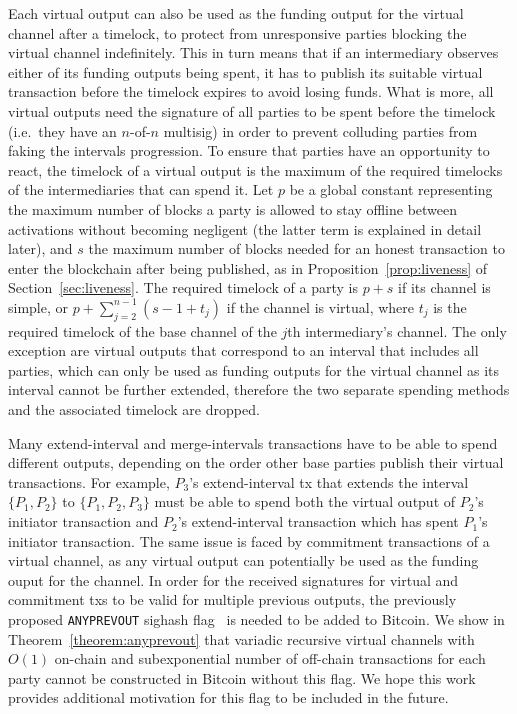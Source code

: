   Each virtual output can also be used as the funding output for the virtual
  channel after a timelock, to protect from unresponsive parties blocking the
  virtual channel indefinitely. This in turn means that if an intermediary
  observes either of its funding outputs being spent, it has to publish its
  suitable virtual transaction before the timelock expires to avoid losing
  funds. What is more, all virtual outputs need the signature of all parties to
  be spent before the timelock (i.e.\ they have an $n$-of-$n$ multisig) in order
  to prevent colluding parties from faking the intervals progression. To ensure
  that parties have an opportunity to react, the timelock of a virtual output is
  the maximum of the required timelocks of the intermediaries that can spend it.
  Let $p$ be a global constant representing the maximum number of blocks a party
  is allowed to stay offline between activations without becoming negligent
  (the latter term is explained in detail later), and
  $s$ the maximum number of blocks needed for an honest transaction to enter the
  blockchain after being published, as in Proposition~\ref{prop:liveness} of
  Section~\ref{sec:liveness}.
  The required timelock of a party is $p + s$ if its channel is simple,  or $p +
  \sum\limits_{j = 2}^{n - 1}(s - 1 + t_j)$ if the channel is virtual, where
  $t_j$ is the required timelock of the base channel
  of the $j$th intermediary's channel. The only exception are virtual outputs that
  correspond to an interval that includes all parties, which can only be used as
  funding outputs for the virtual channel as its interval cannot be further
  extended, therefore the two separate spending methods and the associated
  timelock are dropped.

  Many extend-interval and merge-intervals transactions have to be able to spend
  different outputs, depending on the order other base parties publish their
  virtual transactions. For example, $P_3$'s extend-interval tx that extends the
  interval $\{P_1, P_2\}$ to $\{P_1, P_2, P_3\}$ must be able to spend both
  the virtual output of $P_2$'s initiator transaction and $P_2$'s
  extend-interval transaction which has spent $P_1$'s initiator transaction. The
  same issue is faced by commitment transactions of a virtual channel, as any
  virtual output can potentially be used as the funding ouput for the channel.
  In order for the received signatures for virtual and commitment txs to be
  valid for multiple previous outputs, the previously proposed
  \texttt{ANYPREVOUT} sighash flag~\cite{anyprevout} is needed to be added to
  Bitcoin. We show in Theorem~\ref{theorem:anyprevout} that variadic recursive
  virtual channels with $O(1)$ on-chain and subexponential number of off-chain
  transactions for each party cannot be constructed in Bitcoin without this
  flag. We hope this work provides additional motivation for this flag to be
  included in the future.

